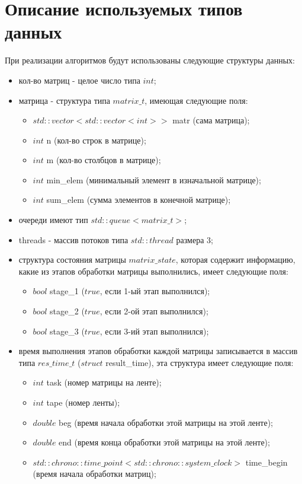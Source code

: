 \documentclass[a4paper,14pt, unknownkeysallowed]{extreport}
\begin{document}
\section{Описание используемых типов данных}

При реализации алгоритмов будут использованы следующие структуры данных:

\begin{itemize}
	\item кол-во матриц - целое число типа $int$;
	\item матрица - структура типа $matrix\_t$, имеющая следующие поля: 
	\begin{itemize}
		\item $std::vector<std::vector<int>>$ matr (сама матрица);
		\item $int$ n (кол-во строк в матрице);
		\item $int$ m (кол-во столбцов в матрице);
		\item $int$ min\_elem (минимальный элемент в изначальной матрице);
		\item $int$ sum\_elem (сумма элементов в конечной матрице);
	\end{itemize}
	\item очереди имеют тип $std::queue<matrix\_t>$;
	\item threads - массив потоков типа $std::thread$ размера 3;
	\item структура состояния матрицы $matrix\_state$, которая содержит информацию, какие из этапов обработки матрицы выполнились, имеет следующие поля: 
	\begin{itemize}
		\item $bool$ stage\_1 ($true$, если 1-ый этап выполнился);
		\item $bool$ stage\_2 ($true$, если 2-ой этап выполнился);
		\item $bool$ stage\_3 ($true$, если 3-ий этап выполнился);
	\end{itemize}
	\item время выполнения этапов обработки каждой матрицы записывается в массив типа $res\_time\_t$ ($struct$ result\_time), эта структура имеет следующие поля:
	\begin{itemize}
		\item $int$ task (номер матрицы на ленте);
		\item $int$ tape (номер ленты);
		\item $double$ beg (время начала обработки этой матрицы на этой ленте);
		\item $double$ end (время конца обработки этой матрицы на этой ленте);
		\item $std::chrono::time\_point<std::chrono::system\_clock>$ time\_begin (время начала обработки матриц);
	\end{itemize}
\end{itemize}
\end{document}
